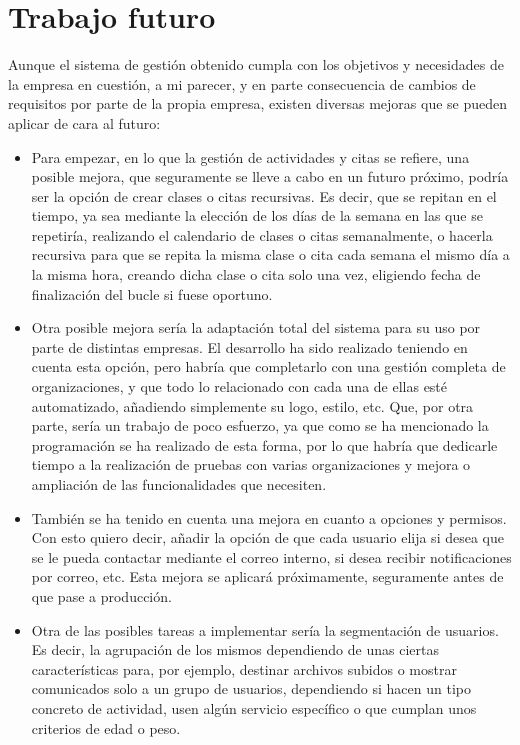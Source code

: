 \section{Trabajo futuro}

Aunque el sistema de gestión obtenido cumpla con los objetivos y necesidades de la empresa en cuestión, a mi parecer, y en parte consecuencia de cambios de requisitos por parte de la propia empresa, existen diversas mejoras que se pueden aplicar de cara al futuro: 

\begin{itemize}
\item Para empezar, en lo que la gestión de actividades y citas se refiere, una posible mejora, que seguramente se lleve a cabo en un futuro próximo, podría ser la opción de crear clases o citas recursivas. Es decir, que se repitan en el tiempo, ya sea mediante la elección de los días de la semana en las que se repetiría, realizando el calendario de clases o citas semanalmente, o hacerla recursiva para que se repita la misma clase o cita cada semana el mismo día a la misma hora, creando dicha clase o cita solo una vez, eligiendo fecha de finalización del bucle si fuese oportuno.
\item Otra posible mejora sería la adaptación total del sistema para su uso por parte de distintas empresas. El desarrollo ha sido realizado teniendo en cuenta esta opción, pero habría que completarlo con una gestión completa de organizaciones, y que todo lo relacionado con cada una de ellas esté automatizado, añadiendo simplemente su logo, estilo, etc. Que, por otra parte, sería un trabajo de poco esfuerzo, ya que como se ha mencionado la programación se ha realizado de esta forma, por lo que habría que dedicarle tiempo a la realización de pruebas con varias organizaciones y mejora o ampliación de las funcionalidades que necesiten.
\item También se ha tenido en cuenta una mejora en cuanto a opciones y permisos. Con esto quiero decir, añadir la opción de que cada usuario elija si desea que se le pueda contactar mediante el correo interno, si desea recibir notificaciones por correo, etc. Esta mejora se aplicará próximamente, seguramente antes de que pase a producción. 
\item Otra de las posibles tareas a implementar sería la segmentación de usuarios. Es decir, la agrupación de los mismos dependiendo de unas ciertas características para, por ejemplo, destinar archivos subidos o mostrar comunicados solo a un grupo de usuarios, dependiendo si hacen un tipo concreto de actividad, usen algún servicio específico o que cumplan unos criterios de edad o peso.

\end{itemize}
